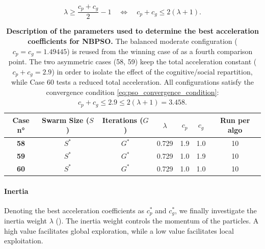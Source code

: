 \documentclass[12pt, openany]{article}
\begin{document}
\begin{equation}\label{eq:pso_convergence_condition}
    \lambda \geq \frac{c_p + c_g}{2} - 1 \quad \Longleftrightarrow \quad c_p + c_g \leq 2(\lambda + 1).
\end{equation}


\begin{table}[H]
    \centering
    \renewcommand{\arraystretch}{1.5}
    \begin{tabular}{|c|c|c|c|c|c|c|}
        \hline 
        \textbf{Case n°} & \textbf{Swarm Size ($S$)} & \textbf{Iterations ($G$)} & $\lambda$ & $c_p$ & $c_g$ & \textbf{Run per algo} \\ \hline

        \textbf{58} & $S^*$ & $G^*$ & 0.729 & 1.9 & 1.0 & 10 \\ \hdashline
        \textbf{59} & $S^*$ & $G^*$ & 0.729 & 1.0 & 1.9 & 10 \\ \hdashline
        \textbf{60} & $S^*$ & $G^*$ & 0.729 & 1.0 & 1.0 & 10 \\ 
        \hline
    \end{tabular}
    \caption{\textbf{Description of the parameters used to determine the best acceleration coefficients for NBPSO.} The balanced moderate configuration ($c_p = c_g = 1.49445$) is reused from the winning case of  as a fourth comparison point. The two asymmetric cases (58, 59) keep the total acceleration constant ($c_p + c_g = 2.9$) in order to isolate the effect of the cognitive/social repartition, while Case 60 tests a reduced total acceleration. All configurations satisfy the convergence condition \eqref{eq:pso_convergence_condition}: $c_p + c_g \leq 2.9 \leq 2(\lambda+1) = 3.458$.}
    \label{tab:Cases_Determine_NBPSO_C1_C2}
\end{table}

\paragraph{Inertia} Denoting the best acceleration coefficients as $c_p^*$ and $c_g^*$, we finally investigate the inertia weight $\lambda$ (). The inertia weight controls the momentum of the particles. A high value facilitates global exploration, while a low value facilitates local exploitation. 
\end{document}
